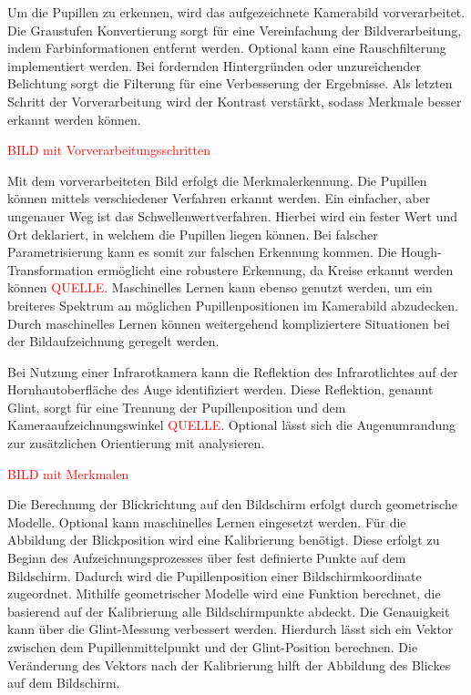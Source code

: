 Um die Pupillen zu erkennen, wird das aufgezeichnete Kamerabild vorverarbeitet. Die Graustufen Konvertierung sorgt für eine Vereinfachung der Bildverarbeitung, indem Farbinformationen entfernt werden. Optional kann eine Rauschfilterung implementiert werden. Bei fordernden Hintergründen oder unzureichender Belichtung sorgt die Filterung für eine Verbesserung der Ergebnisse. Als letzten Schritt der Vorverarbeitung wird der Kontrast verstärkt, sodass Merkmale besser erkannt werden können.

\textcolor{red}{BILD mit Vorverarbeitungsschritten}

Mit dem vorverarbeiteten Bild erfolgt die Merkmalerkennung. Die Pupillen können mittels verschiedener Verfahren erkannt werden. Ein einfacher, aber ungenauer Weg ist das Schwellenwertverfahren. Hierbei wird ein fester Wert und Ort deklariert, in welchem die Pupillen liegen können. Bei falscher Parametrisierung kann es somit zur falschen Erkennung kommen. Die Hough-Transformation ermöglicht eine robustere Erkennung, da Kreise erkannt werden können \textcolor{red}{QUELLE}. Maschinelles Lernen kann ebenso genutzt werden, um ein breiteres Spektrum an möglichen Pupillenpositionen im Kamerabild abzudecken. Durch maschinelles Lernen können weitergehend kompliziertere Situationen bei der Bildaufzeichnung geregelt werden.

Bei Nutzung einer Infrarotkamera kann die Reflektion des Infrarotlichtes auf der Hornhautoberfläche des Auge identifiziert werden. Diese Reflektion, genannt Glint, sorgt für eine Trennung der Pupillenposition und dem Kameraaufzeichnungswinkel \textcolor{red}{QUELLE}. Optional lässt sich die Augenumrandung zur zusätzlichen Orientierung mit analysieren.

\textcolor{red}{BILD mit Merkmalen}

Die Berechnung der Blickrichtung auf den Bildschirm erfolgt durch geometrische Modelle. Optional kann maschinelles Lernen eingesetzt werden. Für die Abbildung der Blickposition wird eine Kalibrierung benötigt. Diese erfolgt zu Beginn des Aufzeichnungsprozesses über fest definierte Punkte auf dem Bildschirm. Dadurch wird die Pupillenposition einer Bildschirmkoordinate zugeordnet. Mithilfe geometrischer Modelle wird eine Funktion berechnet, die basierend auf der Kalibrierung alle Bildschirmpunkte abdeckt. Die Genauigkeit kann über die Glint-Messung verbessert werden. Hierdurch lässt sich ein Vektor zwischen dem Pupillenmittelpunkt und der Glint-Position berechnen. Die Veränderung des Vektors nach der Kalibrierung hilft der Abbildung des Blickes auf dem Bildschirm.

